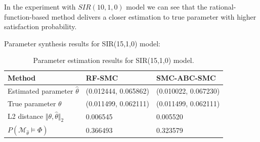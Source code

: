 In the experiment with $SIR(10,1,0)$ model we can see that the rational-function-based method delivers a
closer estimation to true parameter with higher satisfaction probability.

\newpage
\noindent Parameter synthesis results for SIR(15,1,0) model:
\begin{table}[H]
    \begin{tabular}{|l|l|l|}
        \hline
        Method                                           & RF-SMC               & SMC-ABC-SMC          \\ \hline
        Estimated parameter $\hat{\theta}$               & (0.012444, 0.065862) & (0.010022, 0.067230) \\ \hline
        True parameter $\theta$                          & (0.011499, 0.062111) & (0.011499, 0.062111) \\ \hline
        L2 distance $\Vert \theta, \hat{\theta} \Vert_2$ & 0.006545             & 0.005520             \\ \hline
        $P(\mathcal{M}_{\hat{\theta}}\models\Phi)$       & 0.366493             & 0.323579             \\ \hline
    \end{tabular}
    \caption{Parameter estimation results for SIR(15,1,0) model.}
\end{table}

